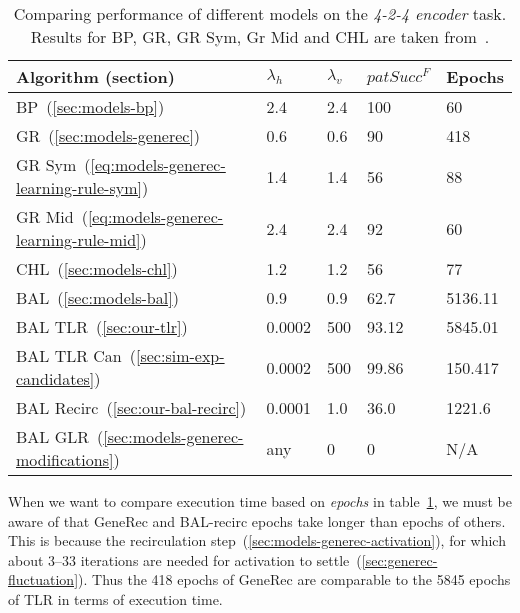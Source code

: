 \begin{table}[H] 
  \centering
    \begin{tabular}{|l|l|l|l|l|}
    \hline
    Algorithm (section)&$\lambda_h$&$\lambda_v$&$patSucc^F$ &Epochs\\ %
    \hline
    BP~(\ref{sec:models-bp}) &2.4 &2.4 &100&60\\ %
    \hline
    GR~(\ref{sec:models-generec}) &0.6 &0.6 &90&418\\ %
    \hline
    GR Sym~(\ref{eq:models-generec-learning-rule-sym}) &1.4 &1.4 &56&88\\ %
    \hline
    GR Mid~(\ref{eq:models-generec-learning-rule-mid}) &2.4 &2.4 &92&60\\ %
    \hline
    CHL~(\ref{sec:models-chl}) &1.2 &1.2 &56&77\\ %
    \hline
    BAL~(\ref{sec:models-bal})&0.9 &0.9 &62.7& 5136.11\\ %
    \hline
    BAL TLR~(\ref{sec:our-tlr})&0.0002  & 500&93.12&5845.01\\ %
    \hline
    BAL TLR Can~(\ref{sec:sim-exp-candidates})&0.0002&500&99.86&150.417\\ %
    \hline
    BAL Recirc~(\ref{sec:our-bal-recirc})&0.0001&1.0&36.0&1221.6\\ %
    \hline
    BAL GLR~(\ref{sec:models-generec-modifications})& any & 0 & 0 & N/A \\
    \hline 
    \end{tabular}
  \caption{Comparing performance of different models on the \emph{4-2-4 encoder} task. Results for BP, GR, GR Sym, Gr Mid and CHL are taken from~\citet{o1996bio}.} 
  \label{tab:results-cmp-auto4}
\end{table}

When we want to compare execution time based on \emph{epochs} in table~\ref{tab:results-cmp-auto4}, we must be aware of that GeneRec and BAL-recirc epochs take longer than epochs of others. This is because the recirculation step~(\ref{sec:models-generec-activation}), for which about 3--33 iterations are needed for activation to settle~(\ref{sec:generec-fluctuation}). Thus the 418 epochs of GeneRec are comparable to the 5845 epochs of TLR in terms of execution time. 
